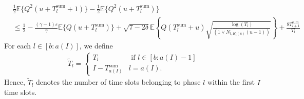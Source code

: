 \documentclass[12pt,draftcls, onecolumn]{IEEEtran}
\begin{document}
\begin{align}\label{eqn:basic_eqn}
     &\frac{1}{2}\mathbb{E}\{Q^2(u+T^{\text{sum}}_l+1)\} - \frac{1}{2}\mathbb{E}\{Q^2(u+T^{\text{sum}}_l)\} 
    \\&\leq 
    \frac{1}{2} -\frac{(\gamma -1)\varepsilon}{\gamma}\mathbb{E}\{Q(u+T^{\text{sum}}_l)\} +  \sqrt{7-2\delta}\mathbb{E}\left\{Q(T^{\text{sum}}_l+u)\sqrt{\frac{\log\left(T_l\right)}{(1 \vee N_{l,K_l(u)}(u-1))}}\right\} +\frac{8T^{\text{sum}}_{l+1}}{T_l} \nonumber
\end{align}
For each $l \in [b:a(I)]$, we define
\begin{align}\label{eqn:til_t}
    \tilde{T}_l = \begin{cases}
        T_l & \text{ if } l \in [b:a(I)-1]\\
        I-T^{\text{sum}}_{a(I)} & l = a(I).
    \end{cases}
\end{align}
Hence, $\tilde{T}_l $ denotes the number of time slots belonging to phase $l$ within the first $I$ time slots.  
\end{document}
